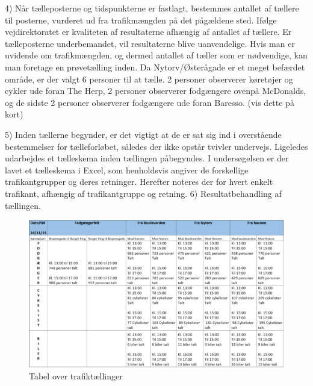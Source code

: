 4) Når tælleposterne og tidspunkterne er fastlagt, bestemmes antallet af tællere til posterne, vurderet ud fra trafikmængden på det pågældene sted. Ifølge vejdirektoratet er kvaliteten af resultaterne afhængig af antallet af tællere. Er tælleposterne underbemandet, vil resultaterne blive uanvendelige. Hvis man er uvidende om trafikmængden, og dermed antallet af tæller som er nødvendige, kan man foretage en prøvetælling inden. Da Nytorv/Østerågade er et meget befærdet område, er der valgt 6 personer til at tælle. 2 personer observerer køretøjer og cykler ude foran The Herp, 2 personer observerer fodgængere ovenpå McDonalds, og de sidste 2 personer observerer fodgængere ude foran Baresso. (vis dette på kort)

5) Inden tællerne begynder, er det vigtigt at de er sat sig ind i overstående bestemmelser for tælleforløbet, således der ikke opstår tvivler undervejs. Ligeledes udarbejdes et tælleskema inden tællingen påbegyndes. I undersøgelsen er der lavet et tælleskema i Excel, som henholdsvis angiver de forskellige trafikantgrupper og deres retninger. Herefter noteres der for hvert enkelt trafikant, afhængig af trafikantgruppe og retning.
6) Resultatbehandling af tællingen.
\begin{figure}[htbp]
   \centering
   \begin{adjustbox}{max width=\textwidth}
     \includegraphics[scale=0.3]{figures/Billederogfigur/resultat.jpg}
  \end{adjustbox}
   \caption{Tabel over trafiktællinger}
   \label{fig:resultat}
 \end{figure}
